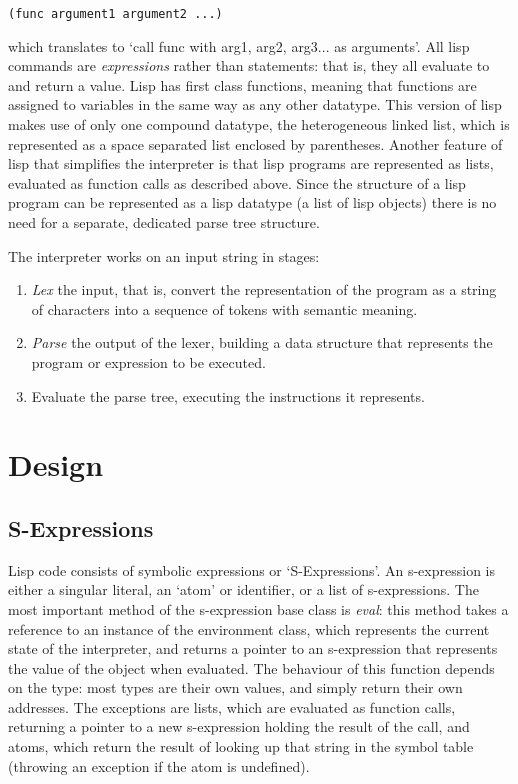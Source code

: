 \documentclass[12pt]{article}
\begin{document}
\begin{lstlisting}
(func argument1 argument2 ...)
\end{lstlisting}


which translates to `call func with arg1, arg2, arg3... as arguments'.
All lisp commands are \textit{expressions} rather than statements:
that is, they all evaluate to and return a value. Lisp has first class
functions, meaning that functions are assigned to variables in the
same way as any other datatype. This version of lisp makes use of only
one compound datatype, the heterogeneous linked list, which is
represented as a space separated list enclosed by parentheses. Another
feature of lisp that simplifies the interpreter is that lisp programs
are represented as lists, evaluated as function calls as described above.
Since the structure of a lisp program can be represented as a
lisp datatype (a list of lisp objects) there is no need for a
separate, dedicated parse tree structure.


The interpreter works on an input string in stages:
\begin{enumerate}
	\item \textit{Lex} the input, that is, convert the
	representation of the program as a string of characters into a
	sequence of tokens with semantic meaning. 
	\item \textit{Parse}
	the output of the lexer, building a data structure that represents
	the program or expression to be executed. 
	\item Evaluate the parse tree,
	executing the instructions it represents.
\end{enumerate}


\section{Design}
\subsection{S-Expressions}
\label{section:sexp}

Lisp code consists of symbolic expressions or `S-Expressions'. An
s-expression is either a singular literal, an `atom' or identifier, or
a list of s-expressions.
The most important method of the s-expression base class is
\textit{eval}: this method takes a reference to an instance of the
environment class, which represents the current state of the
interpreter, and returns a pointer to an s-expression that represents
the value of the object when evaluated. The behaviour of this function
depends on the type: most types are their own values, and simply
return their own addresses. The exceptions are lists,
which are evaluated as function calls, returning a pointer to a new
s-expression holding the result of the call, and atoms, which return
the result of looking up that string in the symbol table (throwing an
exception if the atom is undefined).
\end{document}
